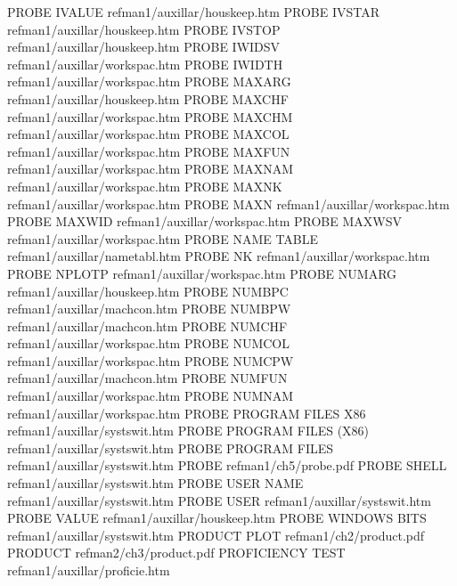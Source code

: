 PROBE IVALUE                            refman1/auxillar/houskeep.htm
PROBE IVSTAR                            refman1/auxillar/houskeep.htm
PROBE IVSTOP                            refman1/auxillar/houskeep.htm
PROBE IWIDSV                            refman1/auxillar/workspac.htm
PROBE IWIDTH                            refman1/auxillar/workspac.htm
PROBE MAXARG                            refman1/auxillar/houskeep.htm
PROBE MAXCHF                            refman1/auxillar/workspac.htm
PROBE MAXCHM                            refman1/auxillar/workspac.htm
PROBE MAXCOL                            refman1/auxillar/workspac.htm
PROBE MAXFUN                            refman1/auxillar/workspac.htm
PROBE MAXNAM                            refman1/auxillar/workspac.htm
PROBE MAXNK                             refman1/auxillar/workspac.htm
PROBE MAXN                              refman1/auxillar/workspac.htm
PROBE MAXWID                            refman1/auxillar/workspac.htm
PROBE MAXWSV                            refman1/auxillar/workspac.htm
PROBE NAME TABLE                        refman1/auxillar/nametabl.htm
PROBE NK                                refman1/auxillar/workspac.htm
PROBE NPLOTP                            refman1/auxillar/workspac.htm
PROBE NUMARG                            refman1/auxillar/houskeep.htm
PROBE NUMBPC                            refman1/auxillar/machcon.htm
PROBE NUMBPW                            refman1/auxillar/machcon.htm
PROBE NUMCHF                            refman1/auxillar/workspac.htm
PROBE NUMCOL                            refman1/auxillar/workspac.htm
PROBE NUMCPW                            refman1/auxillar/machcon.htm
PROBE NUMFUN                            refman1/auxillar/workspac.htm
PROBE NUMNAM                            refman1/auxillar/workspac.htm
PROBE PROGRAM FILES X86                 refman1/auxillar/systswit.htm
PROBE PROGRAM FILES (X86)               refman1/auxillar/systswit.htm
PROBE PROGRAM FILES                     refman1/auxillar/systswit.htm
PROBE                                   refman1/ch5/probe.pdf
PROBE SHELL                             refman1/auxillar/systswit.htm
PROBE USER NAME                         refman1/auxillar/systswit.htm
PROBE USER                              refman1/auxillar/systswit.htm
PROBE VALUE                             refman1/auxillar/houskeep.htm
PROBE WINDOWS BITS                      refman1/auxillar/systswit.htm
PRODUCT PLOT                            refman1/ch2/product.pdf
PRODUCT                                 refman2/ch3/product.pdf
PROFICIENCY TEST                        refman1/auxillar/proficie.htm

